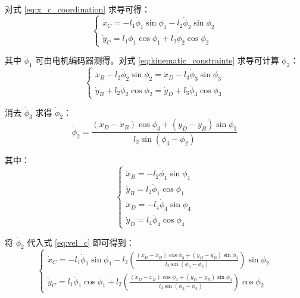 对式 \eqref{eq:x_c_coordination} 求导可得：
\begin{equation}
    \begin{cases}
        \dot{x}_C = -l_1 \dot{\phi}_1 \sin \phi_1 - l_2 \dot{\phi}_2 \sin \phi_2 \\
        \dot{y}_C = l_1 \dot{\phi}_1 \cos \phi_1 + l_2 \dot{\phi}_2 \cos \phi_2
    \end{cases}
    \label{eq:vel_c}
\end{equation}

其中 $\dot{\phi}_1$ 可由电机编码器测得。对式 \eqref{eq:kinematic_constraints} 求导可计算 $\dot{\phi}_2$：
\begin{equation}
    \begin{cases}
        \dot{x}_B - l_2 \dot{\phi}_2 \sin \phi_2 = \dot{x}_D - l_3 \dot{\phi}_3 \sin \phi_3 \\
        \dot{y}_B + l_2 \dot{\phi}_2 \cos \phi_2 = \dot{y}_D + l_3 \dot{\phi}_3 \cos \phi_3
    \end{cases}
    \label{eq:vel_b_d}
\end{equation}

消去 $\dot{\phi}_3$ 求得 $\dot{\phi}_2$：
\begin{equation}
    \dot{\phi}_2 = \frac{(\dot{x}_D - \dot{x}_B) \cos \phi_3 + (\dot{y}_D - \dot{y}_B) \sin \phi_3}{l_2 \sin(\phi_3 - \phi_2)}
\end{equation}

其中：
\begin{equation}
    \begin{cases}
        \dot{x}_B = -l_2 \dot{\phi}_1 \sin \phi_1 \\
        \dot{y}_B = l_2 \dot{\phi}_1 \cos \phi_1 \\
        \dot{x}_D = -l_4 \dot{\phi}_4 \sin \phi_4 \\
        \dot{y}_D = l_4 \dot{\phi}_4 \cos \phi_4
    \end{cases}
\end{equation}

将 $\dot{\phi}_2$ 代入式 \eqref{eq:vel_c} 即可得到：
\begin{equation}
    \begin{cases}
        \dot{x}_C = -l_1 \dot{\phi}_1 \sin \phi_1 - l_2 \left( \frac{(\dot{x}_D - \dot{x}_B) \cos \phi_3 + (\dot{y}_D - \dot{y}_B) \sin \phi_3}{l_2 \sin(\phi_3 - \phi_2)} \right) \sin \phi_2 \\
        \dot{y}_C = l_1 \dot{\phi}_1 \cos \phi_1 + l_2 \left( \frac{(\dot{x}_D - \dot{x}_B) \cos \phi_3 + (\dot{y}_D - \dot{y}_B) \sin \phi_3}{l_2 \sin(\phi_3 - \phi_2)} \right) \cos \phi_2
    \end{cases}
\end{equation}

